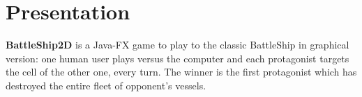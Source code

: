 \documentclass[twoside]{article}
\begin{document}
 \vspace*{.5cm}

\tableofcontents

\section{Presentation}
\textbf{BattleShip2D} is a Java-FX game to play to the classic BattleShip in graphical version: one human user plays versus the computer and each protagonist targets the cell of the other one, every turn. 
The winner is the first protagonist which has destroyed the entire fleet of opponent's vessels.
\end{document}
